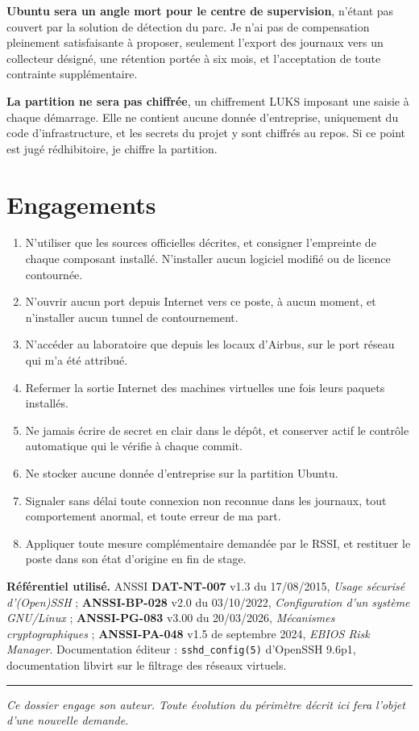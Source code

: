 \documentclass[11pt,a4paper]{article}
\newcommand{\ttb}[1]{\texttt{\small #1}}
\begin{document}
\textbf{Ubuntu sera un angle mort pour le centre de supervision}, n'étant pas
couvert par la solution de détection du parc. Je n'ai pas de compensation
pleinement satisfaisante à proposer, seulement l'export des journaux vers un
collecteur désigné, une rétention portée à six mois, et l'acceptation de toute
contrainte supplémentaire.

\textbf{La partition ne sera pas chiffrée}, un chiffrement LUKS imposant une
saisie à chaque démarrage. Elle ne contient aucune donnée d'entreprise, uniquement
du code d'infrastructure, et les secrets du projet y sont chiffrés au repos. Si ce
point est jugé rédhibitoire, je chiffre la partition.

\section{Engagements}

\begin{enumerate}[leftmargin=1.3em,itemsep=2pt,topsep=3pt]
\item N'utiliser que les sources officielles décrites, et consigner l'empreinte de
chaque composant installé. N'installer aucun logiciel modifié ou de licence
contournée.
\item N'ouvrir aucun port depuis Internet vers ce poste, à aucun moment, et
n'installer aucun tunnel de contournement.
\item N'accéder au laboratoire que depuis les locaux d'Airbus, sur le port réseau
qui m'a été attribué.
\item Refermer la sortie Internet des machines virtuelles une fois leurs paquets
installés.
\item Ne jamais écrire de secret en clair dans le dépôt, et conserver actif le
contrôle automatique qui le vérifie à chaque commit.
\item Ne stocker aucune donnée d'entreprise sur la partition Ubuntu.
\item Signaler sans délai toute connexion non reconnue dans les journaux, tout
comportement anormal, et toute erreur de ma part.
\item Appliquer toute mesure complémentaire demandée par le RSSI, et restituer le
poste dans son état d'origine en fin de stage.
\end{enumerate}

\vspace{6pt}
\noindent\small\textcolor{gris}{\textbf{Référentiel utilisé.}
ANSSI \textbf{DAT-NT-007} v1.3 du 17/08/2015, \emph{Usage sécurisé d'(Open)SSH} ;
\textbf{ANSSI-BP-028} v2.0 du 03/10/2022, \emph{Configuration d'un système
GNU/Linux} ; \textbf{ANSSI-PG-083} v3.00 du 20/03/2026, \emph{Mécanismes
cryptographiques} ; \textbf{ANSSI-PA-048} v1.5 de septembre 2024, \emph{EBIOS Risk
Manager}. Documentation éditeur : \ttb{sshd\_config(5)} d'OpenSSH 9.6p1,
documentation libvirt sur le filtrage des réseaux virtuels.}

\vspace{8pt}
\noindent\textcolor{primary}{\rule{\textwidth}{1pt}}
\vspace{3pt}
\begin{center}\small\itshape\color{gris}
Ce dossier engage son auteur. Toute évolution du périmètre décrit ici fera l'objet d'une nouvelle demande.
\end{center}
\end{document}

